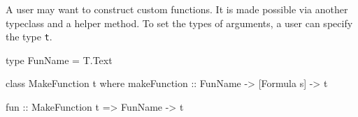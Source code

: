 A user may want to construct custom functions. It is made possible via another typeclass and a helper method. To set the types of arguments, a user can specify the type \texttt{t}.

\begin{mycode}
type FunName = T.Text

class MakeFunction t where
  makeFunction :: FunName -> [Formula s] -> t

fun :: MakeFunction t => FunName -> t
\end{mycode}













